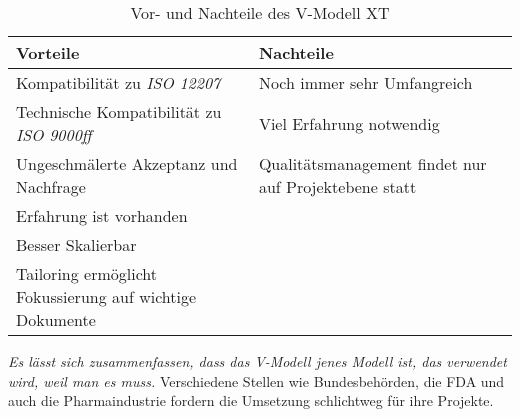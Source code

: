 \begin{table}[H]
    \centering
    \begin{tabulary}{0.9\textwidth}{|p{0.45\textwidth}|p{0.45\textwidth}|}
    \hline 
     Vorteile & Nachteile \\ 
    \hline 
    Kompatibilität zu \textit{ISO 12207} & Noch immer sehr Umfangreich \\
    \hline 
    Technische Kompatibilität zu \textit{ISO 9000ff} & Viel Erfahrung notwendig \\
    \hline
    Ungeschmälerte Akzeptanz und Nachfrage & Qualitätsmanagement findet nur auf Projektebene statt \\
    \hline
    Erfahrung ist vorhanden &  \\ 
    \hline
    Besser Skalierbar &  \\ 
    \hline
    Tailoring ermöglicht Fokussierung auf wichtige Dokumente &  \\
    \hline
    \end{tabulary} 
    \caption[Vor- und Nachteile des V-Modell XT]{Vor- und Nachteile des V-Modell XT}
    \label{tabelle_VModellXTVorNachteile}
\end{table}

\textit{Es lässt sich zusammenfassen, dass das V-Modell jenes Modell ist, das verwendet wird, weil man es muss.} Verschiedene Stellen wie Bundesbehörden, die FDA und auch die Pharmaindustrie fordern die Umsetzung schlichtweg für ihre Projekte.